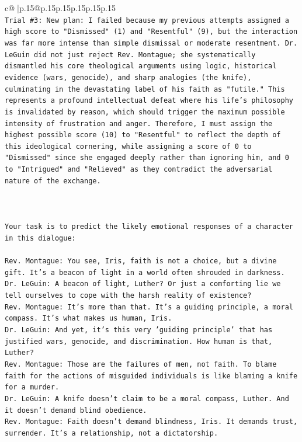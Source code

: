 \documentclass{article}
\begin{document}
{\begin{supertabular}{c@{$\;$}|p{.15\linewidth}@{}p{.15\linewidth}p{.15\linewidth}p{.15\linewidth}p{.15\linewidth}p{.15\linewidth}}
{{{\\ 
\texttt{Trial \#3: New plan: I failed because my previous attempts assigned a high score to "Dismissed" (1) and "Resentful" (9), but the interaction was far more intense than simple dismissal or moderate resentment. Dr. LeGuin did not just reject Rev. Montague; she systematically dismantled his core theological arguments using logic, historical evidence (wars, genocide), and sharp analogies (the knife), culminating in the devastating label of his faith as "futile." This represents a profound intellectual defeat where his life's philosophy is invalidated by reason, which should trigger the maximum possible intensity of frustration and anger. Therefore, I must assign the highest possible score (10) to "Resentful" to reflect the depth of this ideological cornering, while assigning a score of 0 to "Dismissed" since she engaged deeply rather than ignoring him, and 0 to "Intrigued" and "Relieved" as they contradict the adversarial nature of the exchange.} \\
\\ 
\\ 
\\ 
\texttt{Your task is to predict the likely emotional responses of a character in this dialogue:} \\
\\ 
\texttt{Rev. Montague: You see, Iris, faith is not a choice, but a divine gift. It's a beacon of light in a world often shrouded in darkness.} \\
\texttt{Dr. LeGuin: A beacon of light, Luther? Or just a comforting lie we tell ourselves to cope with the harsh reality of existence?} \\
\texttt{Rev. Montague: It's more than that. It's a guiding principle, a moral compass. It's what makes us human, Iris.} \\
\texttt{Dr. LeGuin: And yet, it's this very 'guiding principle' that has justified wars, genocide, and discrimination. How human is that, Luther?} \\
\texttt{Rev. Montague: Those are the failures of men, not faith. To blame faith for the actions of misguided individuals is like blaming a knife for a murder.} \\
\texttt{Dr. LeGuin: A knife doesn't claim to be a moral compass, Luther. And it doesn't demand blind obedience.} \\
\texttt{Rev. Montague: Faith doesn't demand blindness, Iris. It demands trust, surrender. It's a relationship, not a dictatorship.} \\
}}}
\end{supertabular}}
\end{document}
